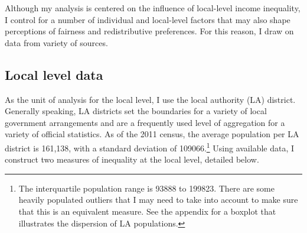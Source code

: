 \documentclass[12pt, letter]{scrartcl}
\begin{document}
Although my analysis is centered on the influence of local-level income inequality, I  control for a number of individual and local-level factors that may also shape perceptions of fairness and redistributive preferences. For this reason, I draw on data from variety of sources.

\subsection{Local level data}

As the unit of analysis for the local level, I use the local authority (LA) district. Generally speaking, LA districts set the boundaries for a variety of local government arrangements and are a frequently used level of aggregation for a variety of official statistics. As of the 2011 census, the average population per LA district is 161,138, with a standard deviation of 109066.\footnote{The interquartile population range is 93888 to 199823. There are some heavily populated outliers that I may need to take into account to make sure that this is an equivalent measure. See the appendix for a boxplot that illustrates the dispersion of LA populations.} Using available data, I construct two measures of inequality at the local level, detailed below.
\end{document}
